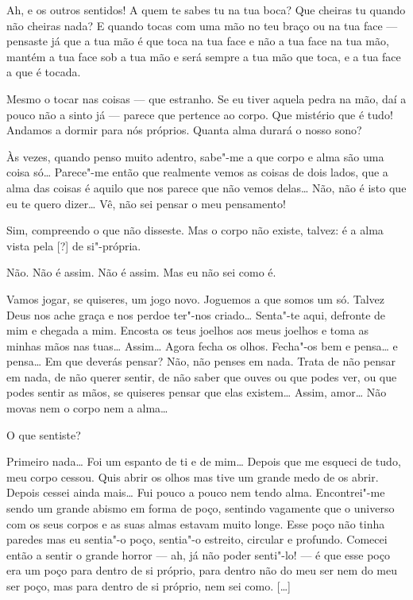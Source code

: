  Ah, e os outros sentidos! A quem te sabes tu na tua boca? Que
cheiras tu quando não cheiras nada? E quando tocas com uma mão no teu
braço ou na tua face --- pensaste já que a tua mão é que toca na tua
face e não a tua face na tua mão, mantém a tua face sob a tua mão e
será sempre a tua mão que toca, e a tua face a que é tocada.

 Mesmo o tocar nas coisas --- que estranho. Se eu tiver aquela pedra
na mão, daí a pouco não a sinto já --- parece que pertence ao corpo.
Que mistério que é tudo! Andamos a dormir para nós próprios. Quanta
alma durará o nosso sono?

\hfill{} 

 Às vezes, quando penso muito adentro, sabe"-me a que corpo e alma
são uma coisa só\ldots{} Parece"-me então que realmente vemos as coisas de
dois lados, que a alma das coisas é aquilo que nos parece que não
vemos delas\ldots{} Não, não é isto que eu te quero dizer\ldots{} Vê, não sei
pensar o meu pensamento!

 Sim, compreendo o que não disseste. Mas o corpo não existe, talvez:
é a alma vista pela [?] de si"-própria.

 Não. Não é assim. Não é assim. Mas eu não sei como é.

 Vamos jogar, se quiseres, um jogo novo. Joguemos a que somos um só.
Talvez Deus nos ache graça e nos perdoe ter"-nos criado\ldots{} Senta"-te
aqui, defronte de mim e chegada a mim. Encosta os teus joelhos aos
meus joelhos e toma as minhas mãos nas tuas\ldots{} Assim\ldots{} Agora fecha
os olhos. Fecha"-os bem e pensa\ldots{} e pensa\ldots{} Em que deverás pensar?
Não, não penses em nada. Trata de não pensar em nada, de não querer
sentir, de não saber que ouves ou que podes ver, ou que podes sentir
as mãos, se quiseres pensar que elas existem\ldots{} Assim, amor\ldots{} Não
movas nem o corpo nem a alma\ldots{}

\hfill{} 

 O que sentiste?

 Primeiro nada\ldots{} Foi um espanto de ti e de mim\ldots{} Depois que me
esqueci de tudo, meu corpo cessou. Quis abrir os olhos mas tive um
grande medo de os abrir. Depois cessei ainda mais\ldots{} Fui pouco a
pouco nem tendo alma. Encontrei"-me sendo um grande abismo em forma de
poço, sentindo vagamente que o universo com os seus corpos e as suas
almas estavam muito longe. Esse poço não tinha paredes mas eu
sentia"-o poço, sentia"-o estreito, circular e profundo. Comecei então
a sentir o grande horror --- ah, já não poder senti"-lo! --- é que esse
poço era um poço para dentro de si próprio, para dentro não do meu
ser nem do meu ser poço, mas para dentro de si próprio, nem sei como.
[\ldots{}] 

